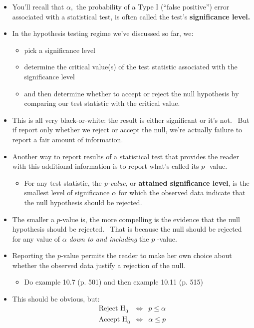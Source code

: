 \documentclass[11pt]{article}
\begin{document}
\begin{itemize}
\item You'll recall that $\alpha ,$ the probability of a Type I
(\textquotedblleft false positive\textquotedblright ) error associated with
a statistical test, is often called the test's \textbf{significance level.}

\item In the hypothesis testing regime we've discussed so far, we:

\begin{itemize}
\item pick a significance level

\item determine the critical value(s) of the test statistic associated with
the significance level

\item and then determine whether to accept or reject the null hypothesis by
comparing our test statistic with the critical value.
\end{itemize}

\item This is all very black-or-white: the result is either significant or
it's not. \ But if report only whether we reject or accept the null, we're
actually failure to report a fair amount of information.

\item Another way to report results of a statistical test that provides the
reader with this additional information is to report what's called its $p$%
-value.

\begin{itemize}
\item For any test statistic, the \textit{p-value}, or \textbf{attained
significance level}, is the smallest level of significance $\alpha $ for
which the observed data indicate that the null hypothesis should be rejected.
\end{itemize}

\item The smaller a $p$-value is, the more compelling is the evidence that
the null hypothesis should be rejected. \ That is because the null should be
rejected for any value of $\alpha $ \textit{down to and including }the $p$%
-value.

\item Reporting the $p$-value permits the reader to make her own choice
about whether the observed data justify a rejection of the null.

\begin{itemize}
\item Do example 10.7 (p. 501) and then example 10.11 (p. 515)
\end{itemize}

\item This should be obvious, but:%
\begin{eqnarray*}
\text{Reject H}_{\text{0}} &\Longleftrightarrow &p\leq \alpha \\
\text{Accept H}_{\text{0}} &\Longleftrightarrow &\alpha \leq p
\end{eqnarray*}
\end{itemize}
\end{document}
